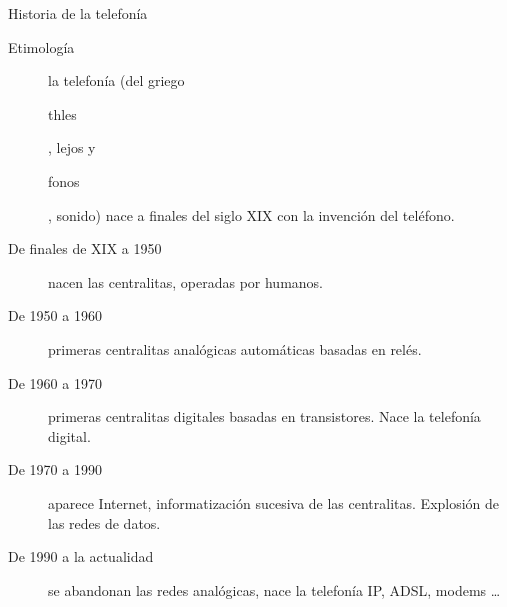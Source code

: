 \documentclass{beamer}
\begin{document}
\begin{frame}{Historia de la telefonía}
  \begin{description}
  \item[Etimología]la telefonía (del griego  
    \begin{otherlanguage}{greek}
      thles
    \end{otherlanguage}, lejos y 
    \begin{otherlanguage}{greek}
      fonos
    \end{otherlanguage}, sonido) nace a finales del siglo XIX con la invención del teléfono.
\item[De finales de XIX a 1950]nacen las centralitas, operadas por humanos.
\item[De 1950 a 1960]primeras centralitas analógicas automáticas basadas en relés.
\item[De 1960 a 1970]primeras centralitas digitales basadas en transistores. Nace la telefonía digital.
\item[De 1970 a 1990]aparece Internet, informatización sucesiva de las centralitas. Explosión de las redes de datos.
\item[De 1990 a la actualidad]se abandonan las redes analógicas, nace la telefonía IP, ADSL, modems \ldots
  \end{description}
\end{frame}

  

   
\end{document}
